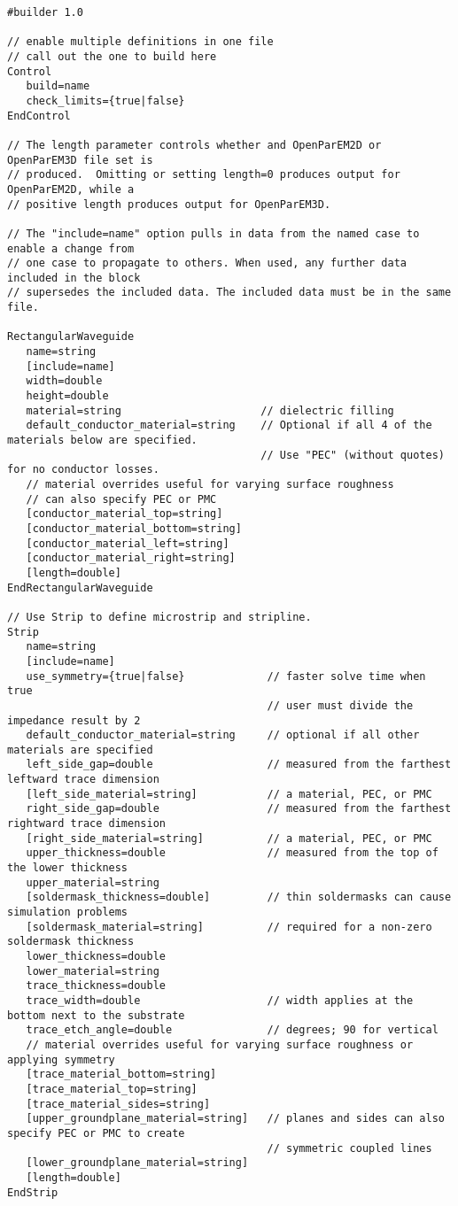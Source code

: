 \documentclass[titlepage]{article}
\renewcommand\_{\textunderscore\linebreak[1]}
\begin{document}
\begin{Verbatim}[fontsize=\small]
#builder 1.0

// enable multiple definitions in one file
// call out the one to build here
Control
   build=name
   check_limits={true|false}
EndControl

// The length parameter controls whether and OpenParEM2D or OpenParEM3D file set is
// produced.  Omitting or setting length=0 produces output for OpenParEM2D, while a
// positive length produces output for OpenParEM3D.

// The "include=name" option pulls in data from the named case to enable a change from
// one case to propagate to others. When used, any further data included in the block
// supersedes the included data. The included data must be in the same file.

RectangularWaveguide
   name=string
   [include=name]
   width=double
   height=double
   material=string                      // dielectric filling
   default_conductor_material=string    // Optional if all 4 of the materials below are specified.
                                        // Use "PEC" (without quotes) for no conductor losses.
   // material overrides useful for varying surface roughness
   // can also specify PEC or PMC
   [conductor_material_top=string]
   [conductor_material_bottom=string]
   [conductor_material_left=string]
   [conductor_material_right=string]
   [length=double]
EndRectangularWaveguide

// Use Strip to define microstrip and stripline.
Strip
   name=string
   [include=name]
   use_symmetry={true|false}             // faster solve time when true
                                         // user must divide the impedance result by 2
   default_conductor_material=string     // optional if all other materials are specified
   left_side_gap=double                  // measured from the farthest leftward trace dimension
   [left_side_material=string]           // a material, PEC, or PMC
   right_side_gap=double                 // measured from the farthest rightward trace dimension
   [right_side_material=string]          // a material, PEC, or PMC
   upper_thickness=double                // measured from the top of the lower thickness
   upper_material=string
   [soldermask_thickness=double]         // thin soldermasks can cause simulation problems
   [soldermask_material=string]          // required for a non-zero soldermask thickness
   lower_thickness=double
   lower_material=string
   trace_thickness=double
   trace_width=double                    // width applies at the bottom next to the substrate
   trace_etch_angle=double               // degrees; 90 for vertical
   // material overrides useful for varying surface roughness or applying symmetry
   [trace_material_bottom=string]
   [trace_material_top=string]
   [trace_material_sides=string]
   [upper_groundplane_material=string]   // planes and sides can also specify PEC or PMC to create
                                         // symmetric coupled lines
   [lower_groundplane_material=string]
   [length=double]
EndStrip


\end{Verbatim}
\end{document}
